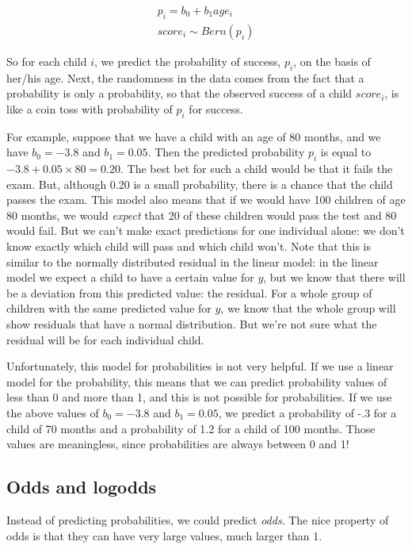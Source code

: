 \documentclass[]{book}\usepackage[]{graphicx}\usepackage[]{color}
\begin{document}
\begin{eqnarray}
p_i = b_0 + b_1 age_i \\
score_i \sim Bern(p_i)
\end{eqnarray}

So for each child $i$, we predict the probability of success, $p_i$, on the basis of her/his age. Next, the randomness in the data comes from the fact that a probability is only a probability, so that the observed success of a child $score_i$, is like a coin toss with probability of $p_i$ for success.

For example, suppose that we have a child with an age of 80 months, and we have $b_0=-3.8$ and $b_1=0.05$. Then the predicted probability $p_i$ is equal to $-3.8 + 0.05 \times 80 = 0.20$. The best bet for such a child would be that it fails the exam. But, although 0.20 is a small probability, there is a chance that the child passes the exam. This model also means that if we would have 100 children of age 80 months, we would \textit{expect} that 20 of these children would pass the test and 80 would fail. But we can't make exact predictions for one individual alone: we don't know exactly which child will pass and which child won't. Note that this is similar to the normally distributed residual in the linear model: in the linear model we expect a child to have a certain value for $y$, but we know that there will be a deviation from this predicted value: the residual. For a whole group of children with the same predicted value for $y$, we know that the whole group will show residuals that have a normal distribution. But we're not sure what the residual will be for each individual child.

Unfortunately, this model for probabilities is not very helpful. If we use a linear model for the probability, this means that we can predict probability values of less than 0 and more than 1, and this is not possible for probabilities. If we use the above values of $b_0=-3.8$ and $b_1=0.05$, we predict a probability of -.3 for a child of 70 months and a probability of 1.2 for a child of 100 months. Those values are meaningless, since probabilities are always between 0 and 1!



\subsection{Odds and logodds}
Instead of predicting probabilities, we could predict \textit{odds}. The nice property of odds is that they can have very large values, much larger than 1.
\end{document}
